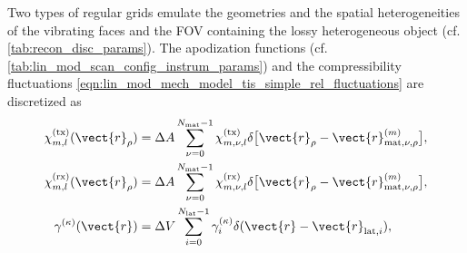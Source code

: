 Two types of
regular grids emulate
the geometries and
the spatial heterogeneities of
the vibrating faces and
the \ac{FOV} containing
the lossy heterogeneous object
(cf. \cref{tab:recon_disc_params}).
The apodization functions
(cf. \cref{tab:lin_mod_scan_config_instrum_params}) and
the compressibility fluctuations
\eqref{eqn:lin_mod_mech_model_tis_simple_rel_fluctuations} are discretized as
\begin{subequations}
\label{eqn:recovery_disc_space_trans_array_spat_trans}
\begin{align}
  \chi_{m, l}^{(\text{tx})}( \vect{r}_{\rho} )
  &=
  \Delta A
  \sum_{ \nu = 0 }^{ N_{\text{mat}} - 1 }
    \chi_{m, \nu, l}^{(\text{tx})}
    \delta\bigl[ \vect{r}_{\rho} - \vect{r}_{\text{mat}, \nu, \rho}^{(m)} \bigr],
 \label{eqn:recovery_disc_space_trans_array_spat_trans_tx}\\
  \chi_{m, l}^{(\text{rx})}( \vect{r}_{\rho} )
  &=
  \Delta A
  \sum_{ \nu = 0 }^{ N_{\text{mat}} - 1 }
    \chi_{m, \nu, l}^{(\text{rx})}
    \delta\bigl[ \vect{r}_{\rho} - \vect{r}_{\text{mat}, \nu, \rho}^{(m)} \bigr],
 \label{eqn:recovery_disc_space_trans_array_spat_trans_rx}\\
  \gamma^{(\kappa)}( \vect{r} )
  &=
  \Delta V
  \sum_{ i = 0 }^{ N_{\text{lat}} - 1 }
    \gamma_{i}^{(\kappa)}
    \delta( \vect{r} - \vect{r}_{\text{lat}, i} ),
 \label{eqn:recovery_disc_space_fov_rel_fluctuations_bp_sampled_kappa}
\end{align}
\end{subequations}
